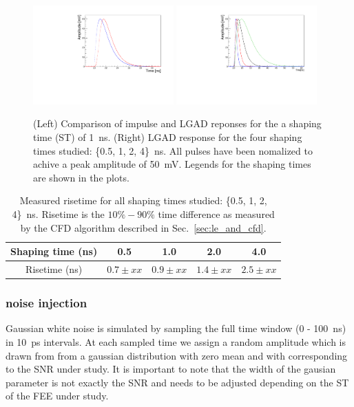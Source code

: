 \documentclass[preprint,1p]{elsarticle}
\begin{document}
\begin{figure}[htbp]
  \centering
  \includegraphics[width=0.48\textwidth]{figs/impulse_vs_lgad_response_1ens_shaping.pdf} \hfill
  \includegraphics[width=0.48\textwidth]{figs/lgad_all_shaping_time_noiseless.pdf}
  \caption{(Left) Comparison of impulse and LGAD reponses for the a shaping time (ST) of 1~\si{ns}.
  (Right) LGAD response for the four shaping times studied: \{0.5, 1, 2, 4\}~\si{ns}. All pulses have been nomalized
  to achive a peak amplitude of 50~\si{mV}. Legends for the shaping times are shown in the plots.}
  \label{fig:ir_and_lgad}
\end{figure}

\begin{table}[!htb]
\scriptsize
\begin{center}
  \begin{tabular}{ |c | c | c | c | c | }
    \hline
    Shaping time (ns) & 0.5         & 1.0         & 2.0         & 4.0 \\ \hline
    Risetime (ns)     & $0.7\pm xx$ & $0.9\pm xx$ & $1.4\pm xx$ & $2.5\pm xx$ \\
    \hline
  \end{tabular}
\caption{Measured risetime for all shaping times studied: \{0.5, 1, 2, 4\}~\si{ns}. Risetime is the $10\% - 90\%$ time
difference as measured by the CFD algorithm described in Sec.~\ref{sec:le_and_cfd}.}
\label{tab:sensors}
\end{center}
\end{table}


\subsubsection{noise injection}\label{sec:noise_simulation}
Gaussian white noise is simulated by sampling the full time window (0 - 100~\si{ns}) in 10~\si{ps} intervals. At each
sampled time we assign a random amplitude which is drawn from from a gaussian distribution with zero mean and with corresponding to the SNR
under study. It is important to note that the width of the gausian parameter is not exactly the SNR and needs to be adjusted depending
on the ST of the FEE under study.
\end{document}
